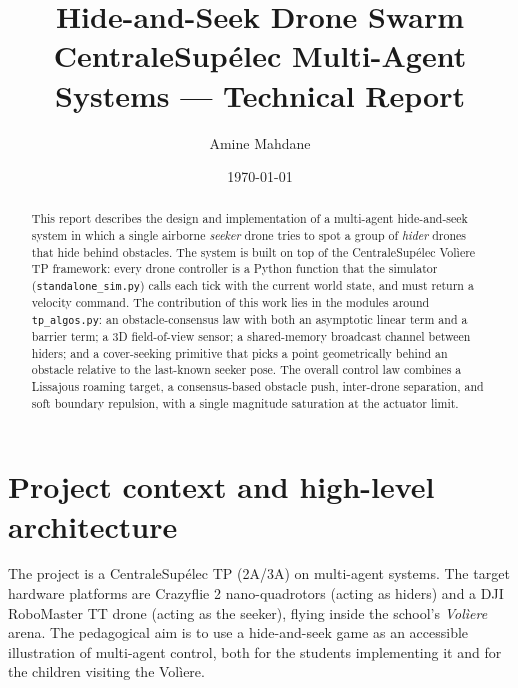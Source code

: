 \documentclass[11pt,a4paper]{article}
\title{Hide-and-Seek Drone Swarm \\
       \large CentraleSup\'elec Multi-Agent Systems --- Technical Report}
\author{Amine Mahdane}
\date{\today}
\newcommand{\code}[1]{\texttt{#1}}
\begin{document}
\maketitle

\begin{abstract}
This report describes the design and implementation of a multi-agent
hide-and-seek system in which a single airborne \emph{seeker} drone tries to
spot a group of \emph{hider} drones that hide behind obstacles. The system is
built on top of the CentraleSup\'elec Vol\`iere TP framework: every drone
controller is a Python function that the simulator (\code{standalone\_sim.py})
calls each tick with the current world state, and must return a velocity
command. The contribution of this work lies in the modules around
\code{tp\_algos.py}: an obstacle-consensus law with both an asymptotic linear
term and a barrier term; a 3D field-of-view sensor; a shared-memory broadcast
channel between hiders; and a cover-seeking primitive that picks a point
geometrically behind an obstacle relative to the last-known seeker pose. The
overall control law combines a Lissajous roaming target, a consensus-based
obstacle push, inter-drone separation, and soft boundary repulsion, with a
single magnitude saturation at the actuator limit.
\end{abstract}

\tableofcontents
\clearpage

\section{Project context and high-level architecture}

The project is a CentraleSup\'elec TP (2A/3A) on multi-agent systems. The
target hardware platforms are Crazyflie 2 nano-quadrotors (acting as hiders)
and a DJI RoboMaster TT drone (acting as the seeker), flying inside the
school's \emph{Vol\`iere} arena. The pedagogical aim is to use a hide-and-seek
game as an accessible illustration of multi-agent control, both for the
students implementing it and for the children visiting the Vol\`iere.
\end{document}
